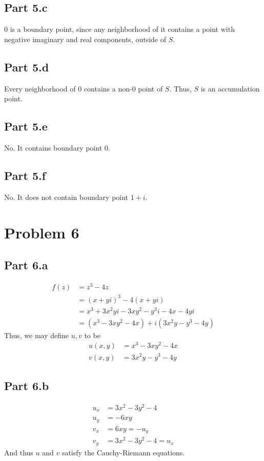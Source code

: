 \documentclass{article}
\theoremstyle{definition}
\begin{document}
\subsection{Part 5.c}
$0$ is a boundary point, since any neighborhood of it contains a point
with negative imaginary and real components, outside of $S$.
\subsection{Part 5.d}
Every neighborhood of $0$ contains a non-$0$ point of $S$. Thus, $S$
is an accumulation point.
\subsection{Part 5.e}
No. It contains boundary point $0$.
\subsection{Part 5.f}
No. It does not contain boundary point $1+i$.

\section{Problem 6}
\subsection{Part 6.a}
\begin{align*}
f(z) 
&= z^3 - 4z \\
&= (x+yi)^3 - 4(x+yi) \\
&= x^3 + 3x^2yi - 3 x y^2 - y^3 i - 4x - 4yi \\ 
&= (x^3 - 3xy^2 - 4x) + i(3x^2 y - y^3 - 4y) 
\end{align*}
Thus, we may define $u,v$ to be
\begin{align*}
u(x,y) &= x^3 - 3xy^2 - 4x \\
v(x,y) &= 3x^2 y - y^3 - 4y
\end{align*}
\subsection{Part 6.b}
\begin{align*}
u_x &= 3x^2 - 3y^2 - 4 \\
u_y &= -6xy \\
v_x &= 6xy = -u_y\\
v_y &= 3x^2 - 3 y^2 - 4 = u_x 
\end{align*}
And thus $u$ and $v$ satisfy the Cauchy-Riemann equations.
\end{document}
